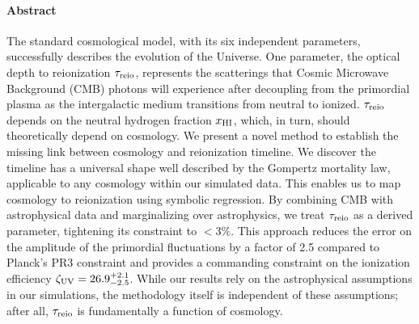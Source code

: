 \paragraph{\large Abstract}  %
The standard cosmological model, with its six independent parameters,
successfully describes the evolution of the
Universe.
One parameter, the optical depth to reionization $\tau_{\mathrm{reio}}$,
represents the scatterings that Cosmic Microwave Background (CMB)
photons will experience after decoupling from the primordial plasma as
the intergalactic medium transitions from neutral to ionized.
$\tau_{\mathrm{reio}}$ depends on the neutral hydrogen fraction $x_{\mathrm{HI}}$, which, in
turn, should theoretically depend on cosmology.
We present a novel method to establish the missing link between
cosmology and reionization timeline.
We discover the timeline has a universal shape well described by the
Gompertz mortality law, applicable to any cosmology within our simulated
data.
This enables us to map cosmology to reionization using
symbolic regression. By combining CMB with astrophysical data
and marginalizing over astrophysics, we treat $\tau_{\mathrm{reio}}$ as a derived parameter, 
tightening its constraint to $<3\%$. This approach 
reduces the error on the amplitude of the primordial fluctuations by a
factor of 2.5 compared to Planck's PR3 constraint and provides a commanding
constraint on the ionization efficiency $\zeta_\mathrm{UV} = 26.9^{+2.1}_{-2.5}$.
While our results rely on the astrophysical assumptions in our
simulations, the methodology itself is independent of these assumptions;
after all, $\tau_{\mathrm{reio}}$ is fundamentally a function of cosmology.
